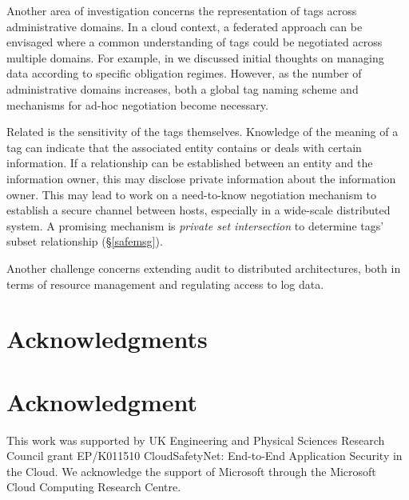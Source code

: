 \documentclass[10pt,journal,compsoc]{IEEEtran}
\begin{document}
Another area of investigation concerns the representation of tags across administrative domains.
In a cloud context, a federated approach can be envisaged where a common understanding of tags could be negotiated across multiple domains.
For example, in \cite{singh2015:claw-magazine} we discussed initial thoughts on managing data according to specific obligation regimes.
However, as the number of administrative domains increases, both a global tag naming scheme and mechanisms for ad-hoc negotiation become necessary.


Related is the sensitivity of the tags themselves.
Knowledge of the meaning of a tag can indicate that the associated entity contains or deals with certain information.
If a relationship can be established between an entity and the information owner, this may disclose private information about the information owner.
This may lead to work on a need-to-know negotiation mechanism to establish a secure channel between hosts, especially in a wide-scale distributed system.
A promising mechanism is \emph{private set intersection} to determine tags' subset relationship (\S\ref{safemsg}).

Another challenge concerns extending audit to distributed architectures, both in terms of resource management  and regulating access to log data.


 
\ifCLASSOPTIONcompsoc
    \section*{Acknowledgments}
\else
    \section*{Acknowledgment}
\fi
\noindent This work was supported by UK Engineering and Physical Sciences Research Council grant EP/K011510 CloudSafetyNet: End-to-End Application Security in the Cloud. We acknowledge the support of Microsoft 
through the Microsoft Cloud Computing Research Centre. 
 


\end{document}
